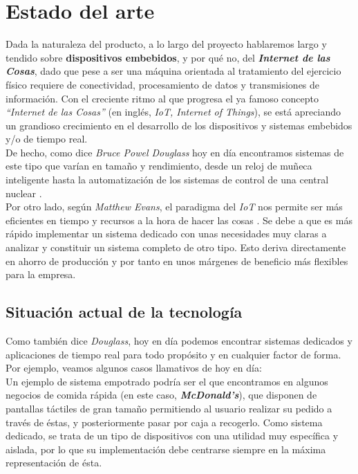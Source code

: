 \chapter{Estado del arte}

Dada la naturaleza del producto, a lo largo del proyecto hablaremos largo y tendido sobre \textbf{dispositivos embebidos}, y por qué no, del \textbf{\textit{Internet de las Cosas}}, dado que pese a ser una máquina orientada al tratamiento del ejercicio físico requiere de conectividad, procesamiento de datos y transmisiones de información. Con el creciente ritmo al que progresa el ya famoso concepto \textit{``Internet de las Cosas''} (en inglés, \textit{IoT, Internet of Things}), se está apreciando un grandioso crecimiento en el desarrollo de los dispositivos y sistemas embebidos y/o de tiempo real.\\

De hecho, como dice \textit{Bruce Powel Douglass} hoy en día encontramos sistemas de este tipo que varían en tamaño y rendimiento, desde un reloj de muñeca inteligente hasta la automatización de los sistemas de control de una central nuclear \cite{real-time-uml-introduction}.\\

Por otro lado, según \textit{Matthew Evans}, el paradigma del \textit{IoT} nos permite ser más eficientes en tiempo y recursos a la hora de hacer las cosas \cite{whats-iot}. Se debe a que es más rápido implementar un sistema dedicado con unas necesidades muy claras a analizar y constituir un sistema completo de otro tipo. Esto deriva directamente en ahorro de producción y por tanto en unos márgenes de beneficio más flexibles para la empresa.\\

\section{Situación actual de la tecnología}

Como también dice \textit{Douglass}, hoy en día podemos encontrar sistemas dedicados y aplicaciones de tiempo real para todo propósito y en cualquier factor de forma. Por ejemplo, veamos algunos casos llamativos de hoy en día:\\

Un ejemplo de sistema empotrado podría ser el que encontramos en algunos negocios de comida rápida (en este caso, \textbf{\textit{McDonald's}}), que disponen de pantallas táctiles de gran tamaño permitiendo al usuario realizar su pedido a través de éstas, y posteriormente pasar por caja a recogerlo. Como sistema dedicado, se trata de un tipo de dispositivos con una utilidad muy específica y aislada, por lo que su implementación debe centrarse siempre en la máxima representación de ésta.

